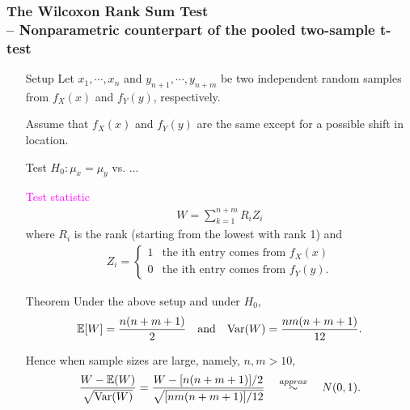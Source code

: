 \begin{frame}[fragile]
\frametitle{The Wilcoxon Rank Sum Test \\ \small -- Nonparametric counterpart of the pooled two-sample t-test}
 \begin{itemize}
 	\item[Setup] Let $x_1,\cdots, x_n$ and  $y_{n+1},\cdots, y_{n+m}$ be two independent random samples from $f_X(x)$ and  $f_Y(y)$, respectively.
	\item[] Assume that  $f_X(x)$ and  $f_Y(y)$ are the same except for a possible shift in location.
	\bigskip
	\item[Test] $H_0:\mu_x=\mu_y$ vs. ...
	\bigskip
	\item[] \textcolor{magenta}{Test statistic}
	\begin{align*}
		W = \sum_{k=1}^{n+m} R_i Z_i
	\end{align*}
	where $R_i$ is the rank (starting from the lowest with rank 1) and
	 \begin{align*}
		Z_i =
		\begin{cases}
			1 &  \text{the ith entry comes from $f_X(x)$}\\
			0 &  \text{the ith entry comes from $f_Y(y)$}.
		\end{cases}
	\end{align*}
\end{itemize}
\end{frame}
\begin{frame}[fragile]
\begin{itemize}
	\item[Theorem] Under the above setup and under $H_0$,
	 \begin{align*}
		\mathbb{E}[ W ]  = \frac{n(n+m+1)}{2}\quad \text{and}\quad \text{Var}(W) = \frac{nm(n+m+1)}{12}.
	\end{align*}
		\bigskip
	\item[Hence] when sample sizes are large, namely, $n,m>10$,
		 \bigskip
	\begin{align*}
		\frac{W-\mathbb{E}(W)}{\sqrt{\text{Var}(W)}} = \frac{W-[n(n+m+1)]/2}{\sqrt{[nm(n+m+1)]/12}} \quad \stackrel{approx}{\sim}\quad N(0,1).
	\end{align*}
\end{itemize}
\end{frame}
